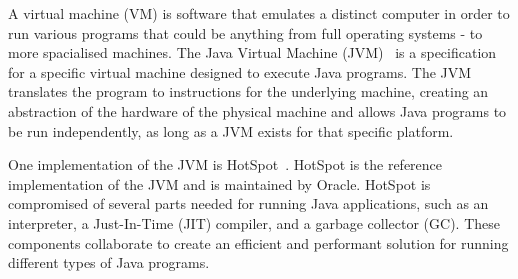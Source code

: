 A virtual machine (VM) is software that emulates a distinct computer in order to run various programs that could be anything from full operating systems - to more spacialised machines. The Java Virtual Machine (JVM)~\cite{JVM} is a specification for a specific virtual machine designed to execute Java programs. The JVM translates the program to instructions for the underlying machine, creating an abstraction of the hardware of the physical machine and allows Java programs to be run independently, as long as a JVM exists for that specific platform. 

One implementation of the JVM is HotSpot~\cite{hotspot}. HotSpot is the reference implementation of the JVM and is maintained by Oracle. HotSpot is compromised of several parts needed for running Java applications, such as an interpreter, a Just-In-Time (JIT) compiler, and a garbage collector (GC). These components collaborate to create an efficient and performant solution for running different types of Java programs.

